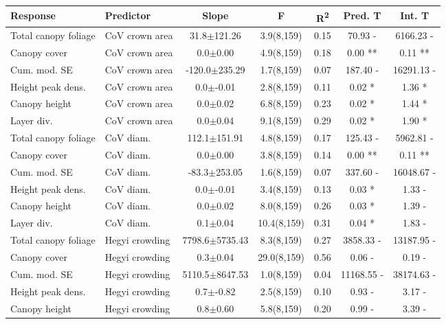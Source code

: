 \begin{table}[H]
\centering
\begin{tabular}{llS[table-format=4.1(4.2)]S[table-format=2.1]S[table-format=1.2]S[table-format=1.2]S[table-format=1.2]}
  \hline
Response & Predictor & Slope & F & R\textsuperscript{2} & Pred. T & Int. T \\ 
  \hline
Total canopy foliage & CoV crown area & 31.8$\pm$121.26 & 3.9(8,159) & 0.15 & 70.93 - & 6166.23 - \\ 
  Canopy cover & CoV crown area & 0.0$\pm$0.00 & 4.9(8,159) & 0.18 & 0.00 ** & 0.11 ** \\ 
  Cum. mod. SE & CoV crown area & -120.0$\pm$235.29 & 1.7(8,159) & 0.07 & 187.40 - & 16291.13 - \\ 
  Height peak dens. & CoV crown area & 0.0$\pm$-0.01 & 2.8(8,159) & 0.11 & 0.02 * & 1.36 * \\ 
  Canopy height & CoV crown area & 0.0$\pm$0.02 & 6.8(8,159) & 0.23 & 0.02 * & 1.44 * \\ 
  Layer div. & CoV crown area & 0.0$\pm$0.04 & 9.1(8,159) & 0.29 & 0.02 * & 1.90 * \\ 
  Total canopy foliage & CoV diam. & 112.1$\pm$151.91 & 4.8(8,159) & 0.17 & 125.43 - & 5962.81 - \\ 
  Canopy cover & CoV diam. & 0.0$\pm$0.00 & 3.8(8,159) & 0.14 & 0.00 ** & 0.11 ** \\ 
  Cum. mod. SE & CoV diam. & -83.3$\pm$253.05 & 1.6(8,159) & 0.07 & 337.60 - & 16048.67 - \\ 
  Height peak dens. & CoV diam. & 0.0$\pm$-0.01 & 3.4(8,159) & 0.13 & 0.03 * & 1.33 - \\ 
  Canopy height & CoV diam. & 0.0$\pm$0.02 & 8.0(8,159) & 0.26 & 0.03 * & 1.39 - \\ 
  Layer div. & CoV diam. & 0.1$\pm$0.04 & 10.4(8,159) & 0.31 & 0.04 * & 1.83 - \\ 
  Total canopy foliage & Hegyi crowding & 7798.6$\pm$5735.43 & 8.3(8,159) & 0.27 & 3858.33 - & 13187.95 - \\ 
  Canopy cover & Hegyi crowding & 0.3$\pm$0.04 & 29.0(8,159) & 0.56 & 0.06 - & 0.19 - \\ 
  Cum. mod. SE & Hegyi crowding & 5110.5$\pm$8647.53 & 1.0(8,159) & 0.04 & 11168.55 - & 38174.63 - \\ 
  Height peak dens. & Hegyi crowding & 0.7$\pm$-0.82 & 2.5(8,159) & 0.10 & 0.93 - & 3.17 - \\ 
  Canopy height & Hegyi crowding & 0.8$\pm$0.60 & 5.8(8,159) & 0.20 & 0.99 - & 3.39 - \\ 

\end{tabular}
\end{table}
